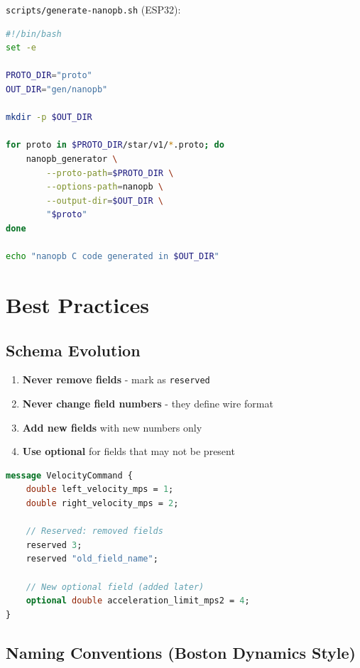 \texttt{scripts/generate-nanopb.sh} (ESP32):

\begin{lstlisting}[language=bash, caption=generate-nanopb.sh]
#!/bin/bash
set -e

PROTO_DIR="proto"
OUT_DIR="gen/nanopb"

mkdir -p $OUT_DIR

for proto in $PROTO_DIR/star/v1/*.proto; do
    nanopb_generator \
        --proto-path=$PROTO_DIR \
        --options-path=nanopb \
        --output-dir=$OUT_DIR \
        "$proto"
done

echo "nanopb C code generated in $OUT_DIR"
\end{lstlisting}

\section{Best Practices}

\subsection{Schema Evolution}

\begin{enumerate}
    \item \textbf{Never remove fields} - mark as \texttt{reserved}
    \item \textbf{Never change field numbers} - they define wire format
    \item \textbf{Add new fields} with new numbers only
    \item \textbf{Use optional} for fields that may not be present
\end{enumerate}

\begin{lstlisting}[language=Protobuf, caption=Schema Evolution Example]
message VelocityCommand {
    double left_velocity_mps = 1;
    double right_velocity_mps = 2;

    // Reserved: removed fields
    reserved 3;
    reserved "old_field_name";

    // New optional field (added later)
    optional double acceleration_limit_mps2 = 4;
}
\end{lstlisting}

\subsection{Naming Conventions (Boston Dynamics Style)}

